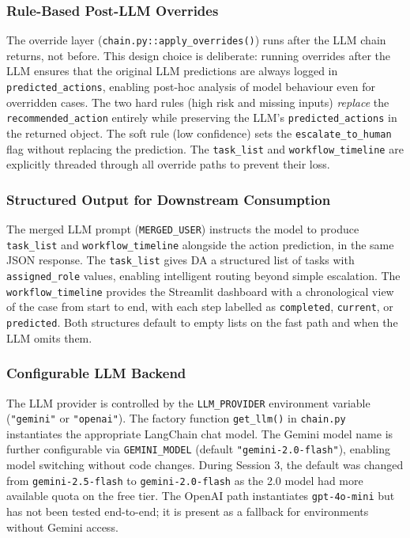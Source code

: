 \documentclass[12pt,a4paper]{article}
\begin{document}
\subsubsection{Rule-Based Post-LLM Overrides}

The override layer (\texttt{chain.py::apply\_overrides()}) runs after the LLM
chain returns, not before. This design choice is deliberate: running overrides
after the LLM ensures that the original LLM predictions are always logged in
\texttt{predicted\_actions}, enabling post-hoc analysis of model behaviour even
for overridden cases. The two hard rules (high risk and missing inputs) \emph{replace}
the \texttt{recommended\_action} entirely while preserving the LLM's \texttt{predicted\_actions}
in the returned object. The soft rule (low confidence) sets the \texttt{escalate\_to\_human}
flag without replacing the prediction. The \texttt{task\_list} and
\texttt{workflow\_timeline} are explicitly threaded through all override paths to
prevent their loss.

\subsubsection{Structured Output for Downstream Consumption}

The merged LLM prompt (\texttt{MERGED\_USER}) instructs the model to produce
\texttt{task\_list} and \texttt{workflow\_timeline} alongside the action prediction,
in the same JSON response. The \texttt{task\_list} gives DA a structured list of
tasks with \texttt{assigned\_role} values, enabling intelligent routing beyond simple
escalation. The \texttt{workflow\_timeline} provides the Streamlit dashboard with a
chronological view of the case from start to end, with each step labelled as
\texttt{completed}, \texttt{current}, or \texttt{predicted}. Both structures default
to empty lists on the fast path and when the LLM omits them.

\subsubsection{Configurable LLM Backend}

The LLM provider is controlled by the \texttt{LLM\_PROVIDER} environment variable
(\texttt{"gemini"} or \texttt{"openai"}). The factory function \texttt{get\_llm()}
in \texttt{chain.py} instantiates the appropriate LangChain chat model. The Gemini
model name is further configurable via \texttt{GEMINI\_MODEL} (default
\texttt{"gemini-2.0-flash"}), enabling model switching without code changes. During
Session 3, the default was changed from \texttt{gemini-2.5-flash} to
\texttt{gemini-2.0-flash} as the 2.0 model had more available quota on the free tier.
The OpenAI path instantiates \texttt{gpt-4o-mini} but has not been tested end-to-end;
it is present as a fallback for environments without Gemini access.
\end{document}
